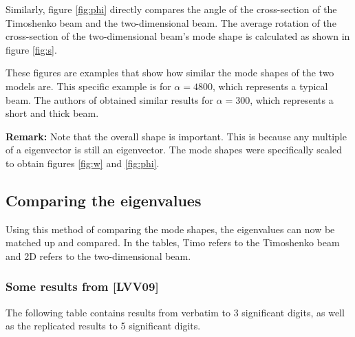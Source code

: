 	Similarly, figure \ref{fig:phi} directly compares the angle of the cross-section of the Timoshenko beam and the two-dimensional beam. The average rotation of the cross-section of the two-dimensional beam's mode shape is calculated as shown in figure \ref{fig:s}.

	\FloatBarrier
	\begin{figure}[ht!]
	\end{figure}
	\FloatBarrier

	These figures are examples that show how similar the mode shapes of the two models are. This specific example is for $\alpha = 4800$, which represents a typical beam. The authors of \cite{LVV09} obtained similar results for $\alpha=300$, which represents a short and thick beam.

	\textbf{Remark:} Note that the overall shape is important. This is because any multiple of a eigenvector is still an eigenvector. The mode shapes were specifically scaled to obtain figures \ref{fig:w} and \ref{fig:phi}.

	\subsection{Comparing the eigenvalues}
	Using this method of comparing the mode shapes, the eigenvalues can now be matched up and compared. In the tables, Timo refers to the Timoshenko beam and 2D refers to the two-dimensional beam.

	\subsubsection{Some results from [LVV09]}
	The following table contains results from \cite{LVV09} verbatim to 3 significant digits, as well as the replicated results to 5 significant digits.



